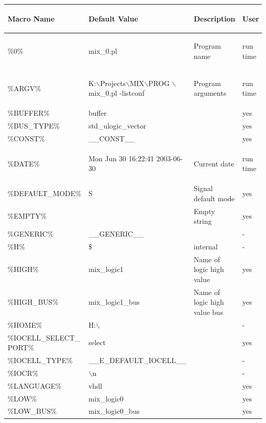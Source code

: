 \documentclass[a4paper,12pt]{article}
\begin{document}
\begin{supertabular}{|p{45mm}|p{6cm}|p{3cm}|l|}\hline
\begin{bf}Macro Name\end{bf}&\begin{bf}Default Value\end{bf}&\begin{bf}Description\end{bf}&\begin{bf}User\end{bf}\\\hline
\%0\% & mix\_0.pl & Program name & \begin{it}run time\end{it} \\\hline
\%ARGV\% & K:$\backslash$Projects$\backslash$MIX$\backslash$PROG $\backslash$mix\_0.pl -listconf & Program arguments & \begin{it}run time\end{it} \\\hline
\%BUFFER\% & buffer & & yes \\\hline
\%BUS\_TYPE\% & std\_ulogic\_vector & & yes \\\hline
\%CONST\% & \_\_CONST\_\_ & & yes\\\hline
\%DATE\% & Mon Jun 30 16:22:41 2003-06-30 & Current date & \begin{it}run time\end{it} \\\hline
\%DEFAULT\_MODE\% & S & Signal default mode & yes \\\hline
\%EMPTY\% & & Empty string & yes \\\hline
\%GENERIC\% & \_\_GENERIC\_\_ & & - \\\hline
\%H\% & \$ & internal & - \\\hline
\%HIGH\% & mix\_logic1 & Name of logic high value & yes \\\hline
\%HIGH\_BUS\% & mix\_logic1\_bus & Name of logic high value bus & yes \\\hline
\%HOME\% & H:$\backslash$ & & - \\\hline
\%IOCELL\_SELECT\_ PORT\% & select & & yes \\\hline
\%IOCELL\_TYPE\% & \_\_E\_DEFAULT\_IOCELL\_\_ & & - \\\hline
\%IOCR\% & $\backslash$n & & - \\\hline
\%LANGUAGE\% & vhdl & & yes \\\hline
\%LOW\% & mix\_logic0 & & yes \\\hline
\%LOW\_BUS\% & mix\_logic0\_bus & & yes \\\hline

\end{supertabular}
\end{document}
